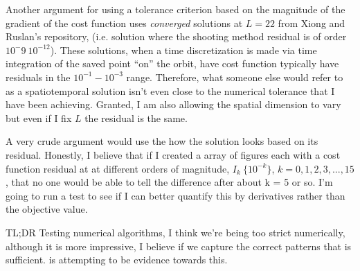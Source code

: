 \begin{description}
{Another argument for using a tolerance criterion based on the magnitude of the gradient of the cost
function uses \emph{converged} solutions at $L=22$ from Xiong and Ruslan's repository, (i.e.
solution where the shooting method residual is of order $10^-{9} ~ 10^{-12}$). These solutions,
when a time discretization is made via time integration of the saved point ``on'' the orbit, have
cost function typically have residuals in the $10^{-1}-10^{-3}$ range. Therefore, what someone else would
refer to as a spatiotemporal solution isn't even close to the numerical tolerance that I have been achieving.
Granted, I am also allowing the spatial dimension to vary but even if I fix $L$ the residual is the same.

A very crude argument would use the how the solution looks based on its residual. Honestly, I believe that
if I created a array of figures each with a cost function residual at at different orders of magnitude,
\ie $I_k ~ \{10^{-k}\}$, $k = 0, 1, 2, 3, ... , 15$, that no one would be able to tell the difference
after about k = 5 or so. I'm going to run a test to see if I can better quantify this by derivatives
rather than the objective value.

TL;DR
Testing numerical algorithms, I think we're being too strict numerically, although it is more impressive,
I believe if we capture the correct patterns that is sufficient.  is
attempting to be evidence towards this.
}



\end{description}
